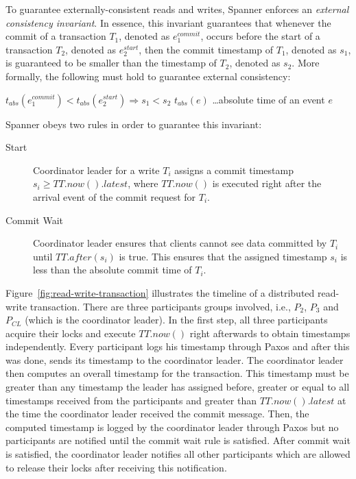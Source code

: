 \documentclass[onecolumn, a4paper, 10pt]{article}
\begin{document}
To guarantee externally-consistent reads and writes, Spanner enforces an
\emph{external consistency invariant}. In essence, this invariant guarantees that
whenever the commit of a transaction $T_1$, denoted as $e_1^{commit}$, occurs
before the start of a transaction $T_2$, denoted as $e_2^{start}$, then the commit
timestamp of $T_1$, denoted as $s_1$, is guaranteed to be smaller than the
timestamp of $T_2$, denoted as $s_2$. More formally, the following must hold to
guarantee external consistency:
\begin{center}
$t_{abs}\left(e_1^{commit}\right) < t_{abs}\left(e_2^{start}\right) \Rightarrow s_1 < s_2$
\qquad\qquad $t_{abs}(e)$ \ldots absolute time of an event $e$
\end{center}

\noindent
Spanner obeys two rules in order to guarantee this invariant:
\begin{description}
  \item[Start] Coordinator leader for a write $T_i$ assigns a commit timestamp
    $s_i \geq TT.now().latest$, where $TT.now()$ is executed right after the
    arrival event of the commit request for $T_i$.
  \item[Commit Wait] Coordinator leader ensures that clients cannot see data
    committed by $T_i$ until $TT.after\left(s_i\right)$ is true. This ensures
    that the assigned timestamp $s_i$ is less than the absolute commit time of
    $T_i$.~\cite{Corbett:2012}
\end{description}

Figure~\ref{fig:read-write-transaction} illustrates the timeline of a distributed
read-write transaction. There are three participants groups involved, i.e., $P_2$,
$P_3$ and $P_{CL}$ (which is the coordinator leader). In the first step, all three
participants acquire their locks and execute $TT.now()$ right afterwards to obtain
timestamps independently. Every participant logs his timestamp through Paxos and
after this was done, sends its timestamp to the coordinator leader. The
coordinator leader then computes an overall timestamp for the transaction. This
timestamp must be greater than any timestamp the leader has assigned before,
greater or equal to all timestamps received from the participants and greater than
$TT.now().latest$ at the time the coordinator leader received the commit message.
Then, the computed timestamp is logged by the coordinator leader through Paxos
but no participants are notified until the commit wait rule is satisfied. After
commit wait is satisfied, the coordinator leader notifies all other participants
which are allowed to release their locks after receiving this notification.
\end{document}
